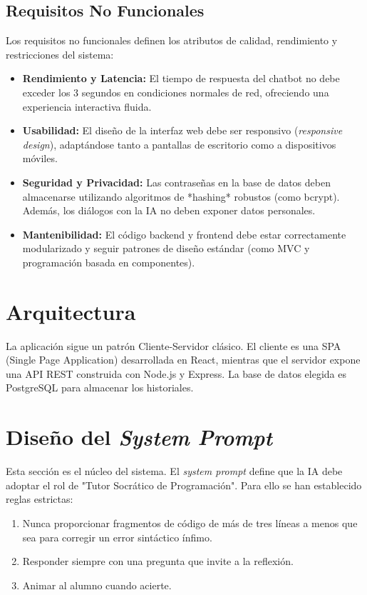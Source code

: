 \subsection{Requisitos No Funcionales}
Los requisitos no funcionales definen los atributos de calidad, rendimiento y restricciones del sistema:
\begin{itemize}
    \item \textbf{Rendimiento y Latencia:} El tiempo de respuesta del chatbot no debe exceder los 3 segundos en condiciones normales de red, ofreciendo una experiencia interactiva fluida.
    \item \textbf{Usabilidad:} El diseño de la interfaz web debe ser responsivo (\textit{responsive design}), adaptándose tanto a pantallas de escritorio como a dispositivos móviles.
    \item \textbf{Seguridad y Privacidad:} Las contraseñas en la base de datos deben almacenarse utilizando algoritmos de *hashing* robustos (como bcrypt). Además, los diálogos con la IA no deben exponer datos personales.
    \item \textbf{Mantenibilidad:} El código backend y frontend debe estar correctamente modularizado y seguir patrones de diseño estándar (como MVC y programación basada en componentes).
\end{itemize}

\section{Arquitectura}
La aplicación sigue un patrón Cliente-Servidor clásico. El cliente es una SPA (Single Page Application) desarrollada en React, mientras que el servidor expone una API REST construida con Node.js y Express. La base de datos elegida es PostgreSQL para almacenar los historiales.

\section{Diseño del \textit{System Prompt}}
Esta sección es el núcleo del sistema. El \textit{system prompt} define que la IA debe adoptar el rol de "Tutor Socrático de Programación". Para ello se han establecido reglas estrictas:
\begin{enumerate}
    \item Nunca proporcionar fragmentos de código de más de tres líneas a menos que sea para corregir un error sintáctico ínfimo.
    \item Responder siempre con una pregunta que invite a la reflexión.
    \item Animar al alumno cuando acierte.
\end{enumerate}
